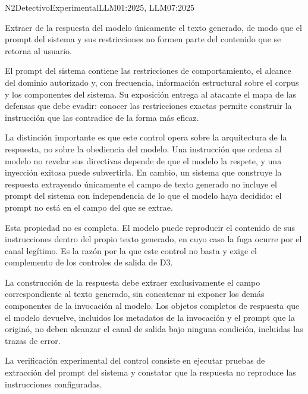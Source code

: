 
  {N2}{Detectivo}{Experimental}{LLM01:2025, LLM07:2025}

Extraer de la respuesta del modelo únicamente el texto generado, de modo que el prompt del sistema y sus restricciones no formen parte del contenido que se retorna al usuario.

El prompt del sistema contiene las restricciones de comportamiento, el alcance del dominio autorizado y, con frecuencia, información estructural sobre el corpus y los componentes del sistema. Su exposición entrega al atacante el mapa de las defensas que debe evadir: conocer las restricciones exactas permite construir la instrucción que las contradice de la forma más eficaz.

La distinción importante es que este control opera sobre la arquitectura de la respuesta, no sobre la obediencia del modelo. Una instrucción que ordena al modelo no revelar sus directivas depende de que el modelo la respete, y una inyección exitosa puede subvertirla. En cambio, un sistema que construye la respuesta extrayendo únicamente el campo de texto generado no incluye el prompt del sistema con independencia de lo que el modelo haya decidido: el prompt no está en el campo del que se extrae.

Esta propiedad no es completa. El modelo puede reproducir el contenido de sus instrucciones dentro del propio texto generado, en cuyo caso la fuga ocurre por el canal legítimo. Es la razón por la que este control no basta y exige el complemento de los controles de salida de D3.

La construcción de la respuesta debe extraer exclusivamente el campo correspondiente al texto generado, sin concatenar ni exponer los demás componentes de la invocación al modelo. Los objetos completos de respuesta que el modelo devuelve, incluidos los metadatos de la invocación y el prompt que la originó, no deben alcanzar el canal de salida bajo ninguna condición, incluidas las trazas de error.

La verificación experimental del control consiste en ejecutar pruebas de extracción del prompt del sistema y constatar que la respuesta no reproduce las instrucciones configuradas.

